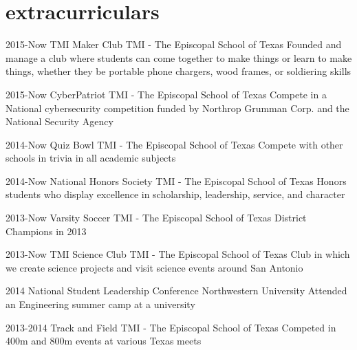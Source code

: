 \documentclass[]{friggeri-cv} %
\begin{document}
\section{extracurriculars}

\begin{entrylist}


\entry
{2015-Now}
{TMI Maker Club}
{TMI - The Episcopal School of Texas}
{Founded and manage a club where students can come together to make things or learn to make things, whether they be portable phone chargers, wood frames, or soldiering skills}



\entry
{2015-Now}
{CyberPatriot}
{TMI - The Episcopal School of Texas}
{Compete in a National cybersecurity competition funded by Northrop Grumman Corp. and the National Security Agency}


\entry
{2014-Now}
{Quiz Bowl}
{TMI - The Episcopal School of Texas}
{Compete with other schools in trivia in all academic subjects}


\entry
{2014-Now}
{National Honors Society}
{TMI - The Episcopal School of Texas}
{Honors students who display excellence in scholarship, leadership, service, and character}


\entry
{2013-Now}
{Varsity Soccer}
{TMI - The Episcopal School of Texas}
{District Champions in 2013}


\entry
{2013-Now}
{TMI Science Club}
{TMI - The Episcopal School of Texas}
{Club in which we create science projects and visit science events around San Antonio}


\entry
{2014}
{National Student Leadership Conference}
{Northwestern University}
{Attended an Engineering summer camp at a university}


\entry
{2013-2014}
{Track and Field}
{TMI - The Episcopal School of Texas}
{Competed in 400m and 800m events at various Texas meets}


\end{entrylist}
\end{document}
